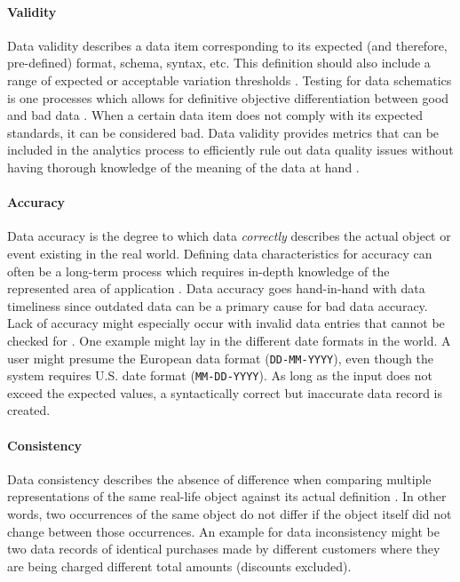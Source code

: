 \paragraph{Validity}
Data validity describes a data item corresponding to its expected (and therefore, pre-defined) format, schema, syntax, etc. This definition should also include a range of expected or acceptable variation thresholds \cite[11]{Askham2013}. Testing for data schematics is one processes which allows for definitive objective differentiation between good and bad data \cite{Schieferdecker2012}. When a certain data item does not comply with its expected standards, it can be considered bad. Data validity provides metrics that can be included in the analytics process to efficiently rule out data quality issues without having thorough knowledge of the meaning of the data at hand \cite{Shen2019}.

\paragraph{Accuracy}
Data accuracy is the degree to which data \textit{correctly} describes the actual object or event existing in the real world. Defining data characteristics for accuracy can often be a long-term process which requires in-depth knowledge of the represented area of application \cite[9]{Askham2013}. Data accuracy goes hand-in-hand with data timeliness since outdated data can be a primary cause for bad data accuracy. Lack of accuracy might especially occur with invalid data entries that cannot be checked for \cite[12]{Askham2013}. One example might lay in the different date formats in the world. A user might presume the European data format (\texttt{DD-MM-YYYY}), even though the system requires U.S. date format (\texttt{MM-DD-YYYY}). As long as the input does not exceed the expected values, a syntactically correct but inaccurate data record is created.

\paragraph{Consistency}
Data consistency describes the absence of difference when comparing multiple representations of the same real-life object against its actual definition \cite[13]{Askham2013}. In other words, two occurrences of the same object do not differ if the object itself did not change between those occurrences. An example for data inconsistency might be two data records of identical purchases made by different customers where they are being charged different total amounts (discounts excluded).


